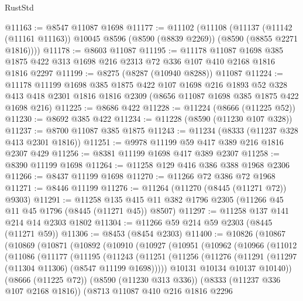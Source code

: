 \begin{lexlean}{RustStd}
\begin{coremodule}
@11163 := @8547 @11087 @1698
@11177 := @11102
    (@11108
      (@11137
        (@11142 (@11161 @11163))
        @10045
        @8596
        (@8590 (@8839 @2269))
        (@8590 (@8855 @2271 @1816))))
@11178 := @8603 @11087
@11195 := @11178
    @11087
    @1698
    @385
    @1875
    @422
    @313
    @1698
    @216
    @2313
    @72
    @336
    @107
    @410
    @2168
    @1816
    @1816
    @2297
@11199 := @8275 (@8287 (@10940 @8288)) @11087
@11224 := @11178
    @11199
    @1698
    @385
    @1875
    @422
    @107
    @1698
    @216
    @1893
    @52
    @328
    @413
    @418
    @2301
    @1816
    @1816
    @2309
    (@8656 @11087 @1698 @385 @1875 @422 @1698 @216)
@11225 := @8686 @422
@11228 := @11224 (@8666 (@11225 @52))
@11230 := @8692 @385 @422
@11234 := @11228 (@8590 (@11230 @107 @328))
@11237 := @8700 @11087 @385 @1875
@11243 := @11234 (@8333 (@11237 @328 @413 @2301 @1816))
@11251 := @9978 @11199 @59 @417 @389 @216 @1816 @2307 @429
@11256 := @8381 @11199 @1698 @417 @389 @2307
@11258 := @8390 @11199 @1698
@11264 := @11258 @129 @416 @386 @388 @1968 @2306
@11266 := @8437 @11199 @1698
@11270 := @11266 @72 @386 @72 @1968
@11271 := @8446 @11199
@11276 := @11264 (@11270 (@8445 (@11271 @72)) @9303)
@11291 := @11258
    @135
    @415
    @11
    @382
    @1796
    @2305
    (@11266 @45 @11 @45 @1796 (@8445 (@11271 @45)) @8507)
@11297 := @11258 @137 @141 @214 @14 @2303 @1802
@11304 := @11266 @59 @214 @59 @2303 (@8445 (@11271 @59))
@11306 := @8453 (@8454 @2303)
@11400 := @10826
    (@10867
      (@10869
        (@10871
          (@10892
            (@10910
              (@10927
                (@10951
                  (@10962
                    (@10966
                      (@11012
                        (@11086
                          (@11177
                            (@11195
                              (@11243
                                (@11251
                                  (@11256
                                    (@11276 (@11291 (@11297 (@11304 @11306) (@8547 @11199 @1698)))))
                                  @10131
                                  @10134
                                  @10137
                                  @10140))
                              (@8666 (@11225 @72))
                              (@8590 (@11230 @313 @336))
                              (@8333 (@11237 @336 @107 @2168 @1816))
                              (@8713
                                @11087
                                @410
                                @216
                                @1816
                                @2296

\end{coremodule}
\end{lexlean}
